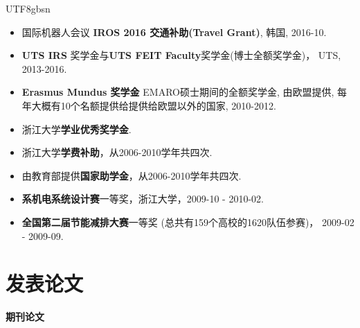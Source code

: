 \documentclass[margin,line]{res}
\begin{document}
\begin{CJK*}{UTF8}{gbsn}
\begin{resume}
\begin{itemize}
\item 国际机器人会议 {\bf IROS 2016 交通补助(Travel Grant)}, 韩国, 2016-10.

\item {\bf UTS IRS} %
奖学金与{\bf UTS FEIT Faculty}奖学金(博士全额奖学金)， UTS, 2013-2016.

%
\item {\bf Erasmus Mundus 奖学金} EMARO硕士期间的全额奖学金, 由欧盟提供, 每年大概有10个名额提供给提供给欧盟以外的国家, 2010-2012.

\item 浙江大学{\bf 学业优秀奖学金}.

\item 浙江大学{\bf 学费补助}，从2006-2010学年共四次.

\item 由教育部提供{\bf 国家助学金}，从2006-2010学年共四次.

\item {\bf 系机电系统设计赛}一等奖，浙江大学，2009-10 - 2010-02.

\item {\bf 全国第二届节能减排大赛}一等奖 (总共有159个高校的1620队伍参赛)， 2009-02 - 2009-09.


\end{itemize}


\section{\sc 发表论文}
%
%
\textbf{期刊论文}


\end{resume}
\end{CJK*}
\end{document}
